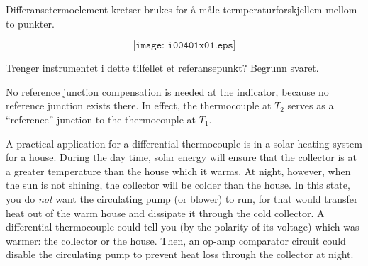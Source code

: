


Differansetermoelement kretser brukes for å måle termperaturforskjellem mellom to punkter. 

$$\texttt{[image: i00401x01.eps]}$$


Trenger instrumentet i dette tilfellet et referansepunkt? Begrunn svaret. 







No reference junction compensation is needed at the indicator, because no reference junction exists there.  In effect, the thermocouple at $T_2$ serves as a ``reference'' junction to the thermocouple at $T_1$.

A practical application for a differential thermocouple is in a solar heating system for a house.  During the day time, solar energy will ensure that the collector is at a greater temperature than the house which it warms.  At night, however, when the sun is not shining, the collector will be colder than the house.  In this state, you do {\it not} want the circulating pump (or blower) to run, for that would transfer heat out of the warm house and dissipate it through the cold collector.  A differential thermocouple could tell you (by the polarity of its voltage) which was warmer: the collector or the house.  Then, an op-amp comparator circuit could disable the circulating pump to prevent heat loss through the collector at night.











